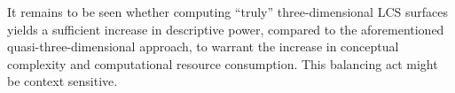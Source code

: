 It remains to be seen whether computing ``truly'' three-dimensional LCS surfaces
yields a sufficient increase in descriptive power, compared to the
aforementioned quasi-three-dimensional approach, to warrant the increase in
conceptual complexity and computational resource consumption. This balancing
act might be context sensitive.
\endgroup
